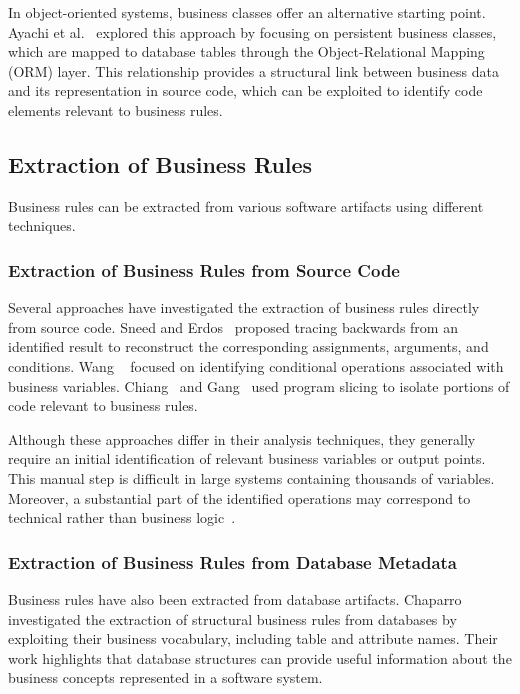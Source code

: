In object-oriented systems, business classes offer an alternative starting point. Ayachi et al.~\cite{Ayac26a} explored this approach by focusing on persistent business classes, which are mapped to database tables through the Object-Relational Mapping (ORM) layer. This relationship provides a structural link between business data and its representation in source code, which can be exploited to identify code elements relevant to business rules.

\subsection{Extraction of Business Rules}

Business rules can be extracted from various software artifacts using different techniques.

\subsubsection{Extraction of Business Rules from Source Code}\noindent

Several approaches have investigated the extraction of business rules directly from source code. Sneed and Erdos~\cite{Snee96a} proposed tracing backwards from an identified result to reconstruct the corresponding assignments, arguments, and conditions. Wang \etal~\cite{Wang08b,Wang04b,Wang04a} focused on identifying conditional operations associated with business variables. Chiang~\cite{Chia06a} and Gang~\cite{Gang09a} used program slicing to isolate portions of code relevant to business rules.

Although these approaches differ in their analysis techniques, they generally require an initial identification of relevant business variables or output points. This manual step is difficult in large systems containing thousands of variables. Moreover, a substantial part of the identified operations may correspond to technical rather than business logic~\cite{Snee20b}.

\subsubsection{Extraction of Business Rules from Database Metadata}\noindent

Business rules have also been extracted from database artifacts. Chaparro \etal~\cite{Chap12a} investigated the extraction of structural business rules from databases by exploiting their business vocabulary, including table and attribute names. Their work highlights that database structures can provide useful information about the business concepts represented in a software system.


